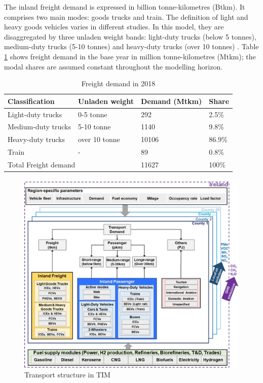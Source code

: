 \documentclass[gmd,manuscript]{copernicus}
\begin{document}
The inland freight demand is expressed in billion tonne-kilometres (Btkm). It comprises two main modes: goods trucks and train. The definition of light and heavy goods vehicles varies in different studies. In this model, they are disaggregated by three unladen weight bands: light-duty trucks (below 5 tonnes), medium-duty trucks (5-10 tonnes) and heavy-duty trucks (over 10 tonnes) \citep{CentralStatisticsOffice2020d,CentralStatisticsOffice2020e,CentralStatisticsOffice2020f}. Table \ref{ton-km} shows freight demand in the base year in million tonne-kilometres (Mtkm); the modal shares are assumed constant throughout the modelling horizon. 

\begin{table}[ht]
 \centering
 \footnotesize
 \caption{Freight demand in 2018 \citep{ CentralStatisticsOffice2020d, CentralStatisticsOffice2020e, CentralStatisticsOffice2020f}}
 \begin{tabular}{llll}
 \hline 
 Classification & Unladen weight & Demand (Mtkm) & Share\\ 
 \hline
 Light-duty trucks & 0-5 tonne & 292 & 2.5\% \\
 Medium-duty trucks & 5-10 tonne & 1140 & 9.8\% \\
 Heavy-duty trucks & over 10 tonne &	10106 & 86.9\% \\
 Train & - &	89 & 0.8\% \\
 
 \multicolumn{2}{l}{Total Freight demand} & 11627 & 100\% \\ \hline
 \end{tabular}
 
 \label{ton-km}
\end{table}

\begin{figure}[ht]
 \centering
 \includegraphics[scale=0.60]{figures/Transport in TIM.jpg} 
 \caption{Transport structure in TIM}
 \label{fig:TRA-TIM}
\end{figure}
\end{document}
